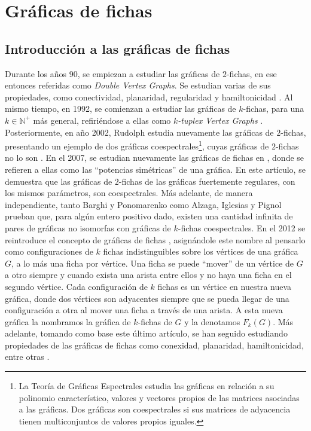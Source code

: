 \chapter{Gr\'aficas de fichas}%
\label{cap:fichass}

\section{Introducci\'on a las gr\'aficas de fichas}%
\label{sec:intro-fichas}


Durante los a\~{n}os 90, se empiezan a estudiar las gr\'aficas de $2$-fichas, en
ese entonces referidas como \textit{Double Vertex Graphs}. Se estudian varias de
sus propiedades, como conectividad, planaridad, regularidad y hamiltonicidad
\cite{alaviPlanarity, alaviDVGraphs, alaviHamilt, zhuConnect}. Al mismo tiempo,
en 1992, se comienzan a estudiar las gr\'aficas de $k$-fichas, para una $k \in
\mathbb{N^{+}}$ m\'as general, refiri\'endose a ellas como \textit{$k$-tuplex
Vertex Graphs} \cite{zhuNTuples}. Posteriormente, en a\~{n}o 2002, Rudolph
estudia nuevamente las gr\'aficas de $2$-fichas, presentando un ejemplo de dos
gr\'aficas coespectrales\footnote{La Teor\'ia de Gr\'aficas Espectrales estudia
las gr\'aficas en relaci\'on a su polinomio caracter\'istico, valores y vectores
propios de las matrices asociadas a las gr\'aficas. Dos gr\'aficas son
coespectrales si sus matrices de adyacencia tienen multiconjuntos de valores
propios iguales.}, cuyas gr\'aficas de $2$-fichas no lo son \cite{rudolphGInv}.
En el 2007, se estudian nuevamente las gr\'aficas de fichas en
\cite{audeanetSymPower}, donde se refieren a ellas como las ``potencias
sim\'etricas'' de una gr\'afica. En este art\'iculo, se demuestra que las
gr\'aficas de $2$-fichas de las gr\'aficas fuertemente regulares, con los mismos
par\'ametros, son coespectrales. M\'as adelante, de manera independiente, tanto
Barghi y Ponomarenko \cite{barghi-ponomarenko} como Alzaga, Iglesias y Pignol
\cite{alzagaSymPower} prueban que, para alg\'un entero positivo dado, existen
una cantidad infinita de pares de gr\'aficas no isomorfas con gr\'aficas de
$k$-fichas coespectrales. En el 2012 se reintroduce el concepto de gr\'aficas de
fichas \cite{fabilaToken}, asign\'andole este nombre al pensarlo como
configuraciones de $k$ fichas indistinguibles sobre los v\'ertices de una
gr\'afica $G$, a lo m\'as una ficha por v\'ertice. Una ficha se puede ``mover''
de un v\'ertice de $G$ a otro siempre y cuando exista una arista entre ellos y
no haya una ficha en el segundo v\'ertice. Cada configuraci\'on de $k$ fichas es
un v\'ertice en nuestra nueva gr\'afica, donde dos v\'ertices son adyacentes
siempre que se pueda llegar de una configuraci\'on a otra al mover una ficha a
trav\'es de una arista. A esta nueva gr\'afica la nombramos la gr\'afica de
$k$-fichas de $G$ y la denotamos $F_k(G)$. M\'as adelante, tomando como base
este \'ultimo art\'iculo, se han seguido estudiando propiedades de las
gr\'aficas de fichas como conexidad, planaridad, hamiltonicidad, entre otras
\cite{carballosaRegPlan, leaConnect, riveraHamilt, adameHamilt, leaEConnect}.

